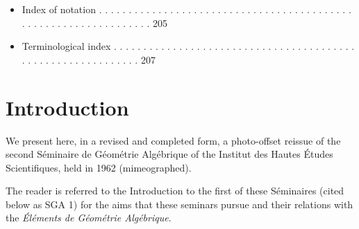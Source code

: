 \documentclass[
  11pt,
  a4paper,
]{book}
\providecommand{\tightlist}{%
  \setlength{\itemsep}{0pt}\setlength{\parskip}{0pt}}
\begin{document}
\begin{itemize}
  \begin{enumerate}
  \def\labelenumi{\arabic{enumi}.}
  \tightlist
  \item
    Cohomological and homotopical depth . . . . . . . . . . . . . . . .
    . . . . . . . . . . . . . . . . . . . . . . . . 159
  \item
    Technical lemmas . . . . . . . . . . . . . . . . . . . . . . . . . .
    . . . . . . . . . . . . . . . . . . . . . . . . . . . . . . . . .
    177
  \item
    Converse of the affine Lefschetz theorem . . . . . . . . . . . . . .
    . . . . . . . . . . . . . . . . . . . . . . . . . 181
  \item
    Main theorem and variants . . . . . . . . . . . . . . . . . . . . .
    . . . . . . . . . . . . . . . . . . . . . . . . . . . . . 187
  \item
    Geometrical depth . . . . . . . . . . . . . . . . . . . . . . . . .
    . . . . . . . . . . . . . . . . . . . . . . . . . . . . . . . . .
    198
  \item
    Open questions . . . . . . . . . . . . . . . . . . . . . . . . . . .
    . . . . . . . . . . . . . . . . . . . . . . . . . . . . . . . . .
    202
  \item
    Bibliography . . . . . . . . . . . . . . . . . . . . . . . . . . . .
    . . . . . . . . . . . . . . . . . . . . . . . . . . . . . . . . . .
    204
  \end{enumerate}
\item
  Index of notation . . . . . . . . . . . . . . . . . . . . . . . . . .
  . . . . . . . . . . . . . . . . . . . . . . . . . . . . . . . . . . .
  . . . . 205
\item
  Terminological index . . . . . . . . . . . . . . . . . . . . . . . . .
  . . . . . . . . . . . . . . . . . . . . . . . . . . . . . . . . . . .
  . 207
\end{itemize}

\chapter{Introduction}\label{introduction}

We present here, in a revised and completed form, a photo-offset reissue
of the second Séminaire de Géométrie Algébrique of the Institut des
Hautes Études Scientifiques, held in 1962 (mimeographed).

The reader is referred to the Introduction to the first of these
Séminaires (cited below as SGA 1) for the aims that these seminars
pursue and their relations with the \emph{Éléments de Géométrie
Algébrique}.
\end{document}
